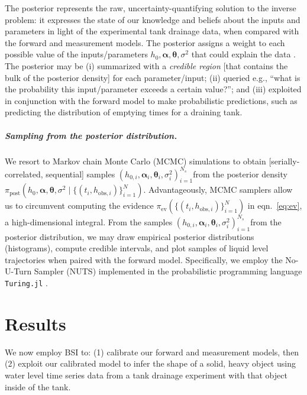 \documentclass[openacc]{rsproca_new}%
\newcommand\thedatanomath {\{(t_i,h_{\text{obs}, i})\}_{i=1}^{N}}
\newcommand\thesamples{$(h_{0, i}, \boldsymbol \alpha_i, \boldsymbol \theta_i, \sigma_i^2)_{i=1}^{N_s}$}
\begin{document}
The posterior represents the raw, uncertainty-quantifying solution to the inverse problem: it expresses the state of our knowledge and beliefs about the inputs and parameters in light of the experimental tank drainage data, when compared with the forward and measurement models. 
The posterior assigns a weight to each possible value of the inputs/parameters $h_0, \boldsymbol \alpha, \boldsymbol \theta, \sigma^2$ that could explain the data \cite{dashti2013bayesian}. 
The posterior may be 
(i) summarized with a \emph{credible region} [that contains the bulk of the posterior density] for each parameter/input;
(ii) queried e.g., ``what is the probability this input/parameter exceeds a certain value?''; and
(iii) exploited in conjunction with the forward model to make probabilistic predictions, such as predicting the distribution of emptying times for a draining tank.

\vspace{-\baselineskip}
\subparagraph{Sampling from the posterior distribution.} We resort to Markov chain Monte Carlo (MCMC) simulations \cite{robert1999monte} to obtain [serially-correlated, sequential] samples \thesamples from the posterior density $\pi_{\text{post}}(h_0, \boldsymbol \alpha, \boldsymbol \theta, \sigma^2 \mid \thedatanomath)$. 
Advantageously, MCMC samplers allow us to circumvent computing the evidence $\pi_{\text{ev}}(\thedatanomath)$ in eqn.~\ref{eq:ev}, a high-dimensional integral.  From the samples \thesamples from the posterior distribution, we may draw empirical posterior distributions (histograms), compute credible intervals, and plot samples of liquid level trajectories when paired with the forward model.
Specifically, we employ the No-U-Turn Sampler (NUTS) \cite{hoffman2014no} implemented in the probabilistic programming language \cite{gordon2014probabilistic} \texttt{Turing.jl} \cite{ge2018turing}.

\section{Results}
We now employ BSI to:
(1) calibrate our forward and measurement models, then
(2) exploit our calibrated model to infer the shape of a solid, heavy object using water level time series data from a tank drainage experiment with that object inside of the tank.
\end{document}
